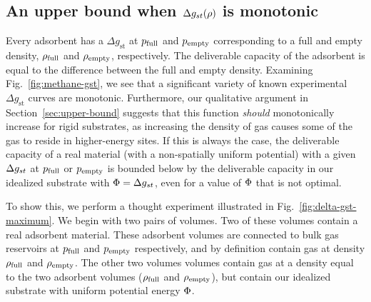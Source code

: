 \subsection{An upper bound when $\Delta g_{st}(\rho)$ is monotonic}\label{sec:monotonic}
Every adsorbent has a $\Delta g_\text{st}$ at $p_{\text{full}}$ and $p_{\text{empty}}$ corresponding
to a full and empty density, $\rho_{\text{full}}$ and $\rho_{\text{empty}}$, respectively. The deliverable capacity of the adsorbent is equal to
the difference between the full and empty density. Examining
Fig.~\ref{fig:methane-gst}, we see that a significant variety of known
experimental $\Delta g_\text{st}$ curves are monotonic. Furthermore, our
qualitative argument in Section~\ref{sec:upper-bound} suggests that this
function \emph{should} monotonically increase for rigid substrates, as
increasing the density of gas causes some of the gas to reside in higher-energy
sites. If this is always the case, the deliverable capacity of a real material
(with a non-spatially uniform potential) with a given $\Delta g_{st}$ at $p_{\text{full}}$ or
$p_{\text{empty}}$ is bounded below by the deliverable capacity in our idealized
substrate with $\Phi=\Delta g_{st}$, even for a value of $\Phi$ that is not optimal.

To show this, we perform a thought experiment illustrated in
Fig.~\ref{fig:delta-gst-maximum}. We begin with two pairs of volumes.  Two of
these volumes contain a real adsorbent material.  These adsorbent volumes are
connected to bulk gas reservoirs at $p_{\text{full}}$ and $p_{\text{empty}}$ respectively, and
by definition contain gas at density $\rho_{\text{full}}$ and $\rho_{\text{empty}}$.  The other two volumes
volumes contain gas at a density equal to the two adsorbent volumes ($\rho_{\text{full}}$ and $\rho_{\text{empty}}$), but contain our
idealized substrate with uniform potential energy $\Phi$.

